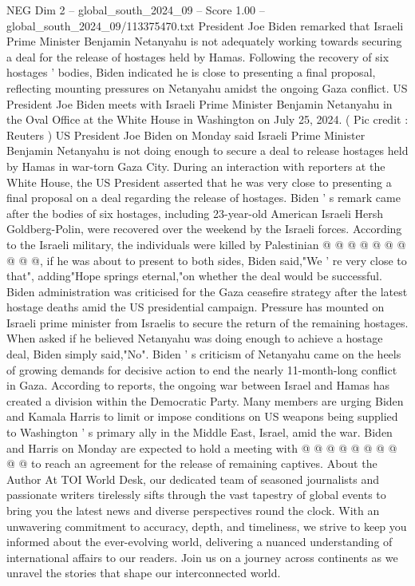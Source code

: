 \begin{textsample}{NEG Dim 2 – global\_south\_2024\_09 – Score 1.00 – global\_south\_2024\_09/113375470.txt}  \label{ex:f2_neg_409}
President Joe Biden remarked that Israeli Prime Minister Benjamin Netanyahu is not adequately working towards securing a deal for the release of hostages held by Hamas.
Following the recovery of six hostages ' bodies, Biden indicated he is close to presenting a final proposal, reflecting mounting pressures on Netanyahu amidst the ongoing Gaza conflict.
US President Joe Biden meets with Israeli Prime Minister Benjamin Netanyahu in the Oval Office at the White House in Washington on July 25, 2024. ( Pic credit : Reuters ) US President Joe Biden on Monday said Israeli Prime Minister Benjamin Netanyahu is not doing enough to secure a deal to release hostages held by Hamas in war-torn Gaza City.
During an interaction with reporters at the White House, the US President asserted that he was very close to presenting a final proposal on a deal regarding the release of hostages.
Biden ' s remark came after the bodies of six hostages, including 23-year-old American Israeli Hersh Goldberg-Polin, were recovered over the weekend by the Israeli forces.
According to the Israeli military, the individuals were killed by Palestinian @ @ @ @ @ @ @ @ @ @, if he was about to present to both sides, Biden said,"We ' re very close to that", adding"Hope springs eternal,"on whether the deal would be successful.
Biden administration was criticised for the Gaza ceasefire strategy after the latest hostage deaths amid the US presidential campaign.
Pressure has mounted on Israeli prime minister from Israelis to secure the return of the remaining hostages.
When asked if he believed Netanyahu was doing enough to achieve a hostage deal, Biden simply said,"No".
Biden ' s criticism of Netanyahu came on the heels of growing demands for decisive action to end the nearly 11-month-long conflict in Gaza.
According to reports, the ongoing war between Israel and Hamas has created a division within the Democratic Party.
Many members are urging Biden and Kamala Harris to limit or impose conditions on US weapons being supplied to Washington ' s primary ally in the Middle East, Israel, amid the war.
Biden and Harris on Monday are expected to hold a meeting with @ @ @ @ @ @ @ @ @ @ to reach an agreement for the release of remaining captives.
About the Author At TOI World Desk, our dedicated team of seasoned journalists and passionate writers tirelessly sifts through the vast tapestry of global events to bring you the latest news and diverse perspectives round the clock.
With an unwavering commitment to accuracy, depth, and timeliness, we strive to keep you informed about the ever-evolving world, delivering a nuanced understanding of international affairs to our readers.
Join us on a journey across continents as we unravel the stories that shape our interconnected world.

\end{textsample}
